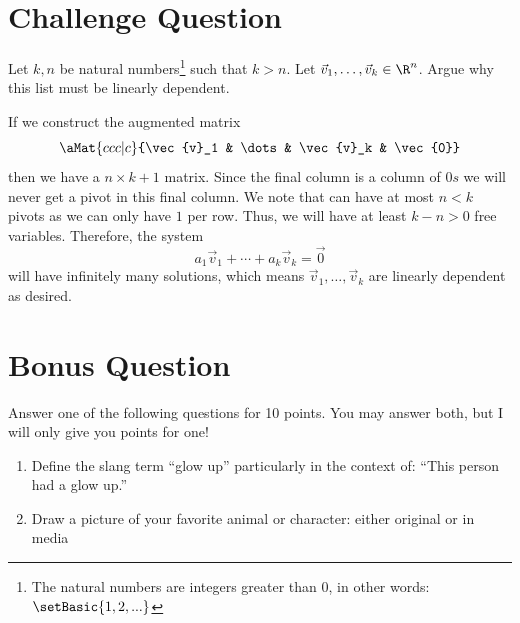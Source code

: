 \documentclass[12pt,addpoints,answers]{exam}
\begin{document}
\begin{questions}
    \section*{Challenge Question}
    \question[20] Let $k,n$ be natural numbers\footnote{The natural numbers are integers greater than 0,
    in other words: $\setBasic{1,2,...}$} such that $k>n$. Let $\vec{v}_1,\dots,\vec{v}_k\in\R^n$.
    Argue why this list must be linearly dependent.
    \begin{solution}
        If we construct the augmented matrix
        \[
            \aMat{ccc|c}{\vec{v}_1 & \dots & \vec{v}_k & \vec{0}}
        \]
        then we have a $n\times k+1$ matrix. Since the final column is a column of $0s$ we will never get
        a pivot in this final column. We note that can have at most $n<k$ pivots
        as we can only have $1$ per row. Thus, we will have at least $k-n>0$ free
        variables. Therefore, the system
        \[
            a_1\vec{v}_1 + \cdots + a_k\vec{v}_k = \vec{0}
        \]
        will have infinitely many solutions, which means $\vec{v}_1,\dots,\vec{v}_k$ are linearly dependent as desired.
    \end{solution}
    \newpage
    \section*{Bonus Question}
    \question[10] Answer one of the following questions for 10 points. You may answer both, but I will
    only give you points for one!
    \begin{enumerate}
        \item Define the slang term ``glow up'' particularly in the context of:
            ``This person had a glow up.''
        \item Draw a picture of your favorite animal or character: either original or in media
    \end{enumerate}
\end{questions}
\end{document}
